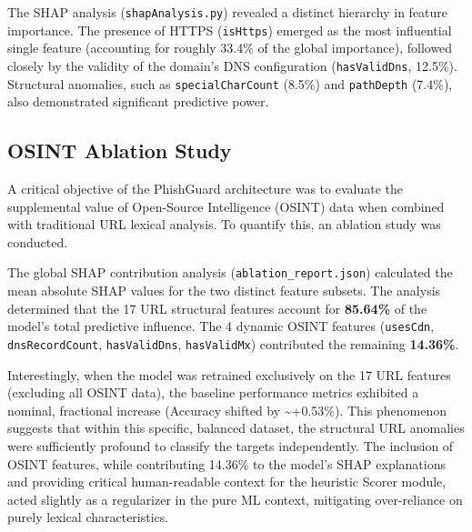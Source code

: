The SHAP analysis (\texttt{shapAnalysis.py}) revealed a distinct
hierarchy in feature importance. The presence of HTTPS
(\texttt{isHttps}) emerged as the most influential single feature
(accounting for roughly 33.4\% of the global importance), followed
closely by the validity of the domain's DNS configuration
(\texttt{hasValidDns}, 12.5\%). Structural anomalies, such as
\texttt{specialCharCount} (8.5\%) and \texttt{pathDepth} (7.4\%), also
demonstrated significant predictive power.

\subsection{OSINT Ablation Study}\label{osint-ablation-study}

A critical objective of the PhishGuard architecture was to evaluate the
supplemental value of Open-Source Intelligence (OSINT) data when
combined with traditional URL lexical analysis. To quantify this, an
ablation study was conducted.

The global SHAP contribution analysis (\texttt{ablation\_report.json})
calculated the mean absolute SHAP values for the two distinct feature
subsets. The analysis determined that the 17 URL structural features
account for \textbf{85.64\%} of the model's total predictive influence.
The 4 dynamic OSINT features (\texttt{usesCdn}, \texttt{dnsRecordCount},
\texttt{hasValidDns}, \texttt{hasValidMx}) contributed the remaining
\textbf{14.36\%}.

Interestingly, when the model was retrained exclusively on the 17 URL
features (excluding all OSINT data), the baseline performance metrics
exhibited a nominal, fractional increase (Accuracy shifted by
\textasciitilde+0.53\%). This phenomenon suggests that within this
specific, balanced dataset, the structural URL anomalies were
sufficiently profound to classify the targets independently. The
inclusion of OSINT features, while contributing 14.36\% to the model's
SHAP explanations and providing critical human-readable context for the
heuristic Scorer module, acted slightly as a regularizer in the pure ML
context, mitigating over-reliance on purely lexical characteristics.


